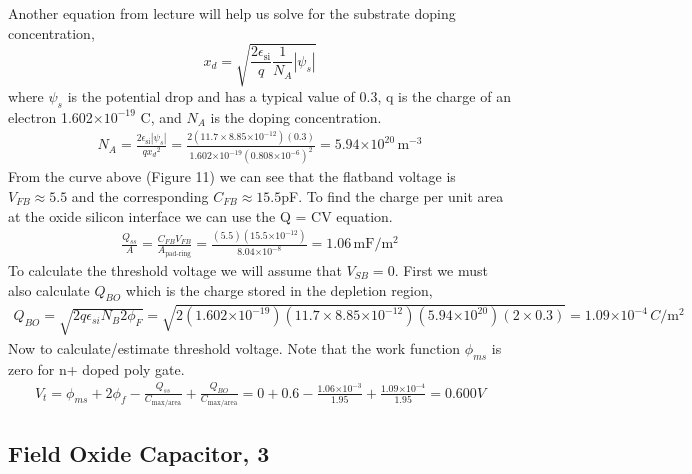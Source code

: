 \documentclass{article}
\providecommand{\e}[1]{\ensuremath{\times 10^{#1}}}
\begin{document}
Another equation from lecture will help us solve for the substrate doping concentration,
\begin{equation}
x_d = \sqrt{\frac{2\epsilon_{\text{si}}}{q}\frac{1}{N_A}|\psi_s|}
\end{equation}
where $\psi_s$ is the potential drop and has a typical value of 0.3, q is the charge of an electron 1.602\e{-19} C, and $N_A$ is the doping concentration.
\begin{align*}
N_A = \frac{2\epsilon_{\text{si}} |\psi_s|}{q{x_d}^2} = \frac{2(11.7 \times 8.85\e{-12})(0.3)}{1.602\e{-19}(0.808\e{-6})^2} = 5.94\e{20} \,{\text{m}}^{-3}
\end{align*}
From the curve above (Figure 11) we can see that the flatband voltage is $V_{FB} \approx 5.5$ and the corresponding $C_{FB} \approx 15.5$pF. To find the charge per unit area at the oxide silicon interface we can use the Q = CV equation.
\begin{align*}
\frac{Q_{ss}}{A} = \frac{C_{FB}V_{FB}}{A_{\text{pad-ring}}} = \frac{(5.5)(15.5\e{-12})}{8.04\e{-8}} = 1.06 \,\text{mF}/\text{m}^2
\end{align*}
To calculate the threshold voltage we will assume that $V_{SB} = 0$. First we must also calculate $Q_{BO}$ which is the charge stored in the depletion region,
\begin{align*}
Q_{BO} = \sqrt{2q\epsilon_{si}N_B2\phi_F} = \sqrt{2(1.602\e{-19})(11.7 \times 8.85\e{-12})(5.94\e{20})(2 \times 0.3)} = 1.09\e{-4}\, C/{\text{m}}^2
\end{align*}
Now to calculate/estimate threshold voltage. Note that the work function $\phi_{ms}$ is zero for n+ doped poly gate.
\begin{align*}
V_t = \phi_{ms} + 2\phi_f - \frac{Q_{ss}}{C_{\text{max/area}}} + \frac{Q_{BO}}{C_{\text{max/area}}} = 0 + 0.6 - \frac{1.06\e{-3}}{1.95} + \frac{1.09\e{-4}}{1.95} = 0.600 V
\end{align*}

\subsection{Field Oxide Capacitor, 3} %
\end{document}

